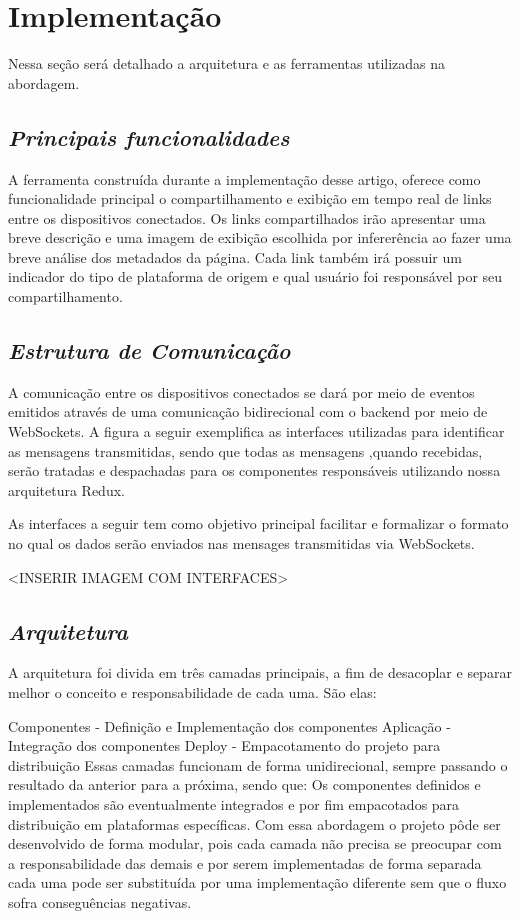 \section{\esp Implementação}

Nessa seção será detalhado a arquitetura e as ferramentas utilizadas na abordagem.


\subsection{{\it Principais funcionalidades}}

A ferramenta construída durante a implementação desse artigo, oferece como funcionalidade principal o compartilhamento e exibição em tempo real de links entre os dispositivos conectados.
Os links compartilhados irão apresentar uma breve descrição e uma imagem de exibição escolhida por infererência ao fazer uma breve análise dos metadados da página. Cada link também irá possuir um indicador do tipo de plataforma de origem e qual usuário foi responsável por seu compartilhamento.

\subsection{{\it Estrutura de Comunicação}}

A comunicação entre os dispositivos conectados se dará por meio de eventos emitidos através de uma comunicação bidirecional com o backend por meio de WebSockets. A figura a seguir exemplifica as interfaces utilizadas para identificar as mensagens transmitidas, sendo que todas as mensagens ,quando recebidas, serão tratadas e despachadas para os componentes responsáveis utilizando nossa arquitetura Redux. 

As interfaces a seguir tem como objetivo principal facilitar e formalizar o formato no qual os dados serão enviados nas mensages transmitidas via WebSockets.

<INSERIR IMAGEM COM INTERFACES>

\subsection{{\it Arquitetura}}

A arquitetura foi divida em três camadas principais, a fim de desacoplar e separar melhor o conceito e responsabilidade de cada uma. São elas:

Componentes - Definição e Implementação dos componentes
Aplicação - Integração dos componentes 
Deploy - Empacotamento do projeto para distribuição
Essas camadas funcionam de forma unidirecional, sempre passando o resultado da anterior para a próxima, sendo que: Os componentes definidos e implementados são eventualmente integrados e por fim empacotados para distribuição em plataformas específicas. Com essa abordagem o projeto pôde ser desenvolvido de forma modular, pois cada camada não precisa se preocupar com a responsabilidade das demais e por serem implementadas de forma separada cada uma pode ser substituída por uma implementação diferente sem que o fluxo sofra conseguências negativas.

